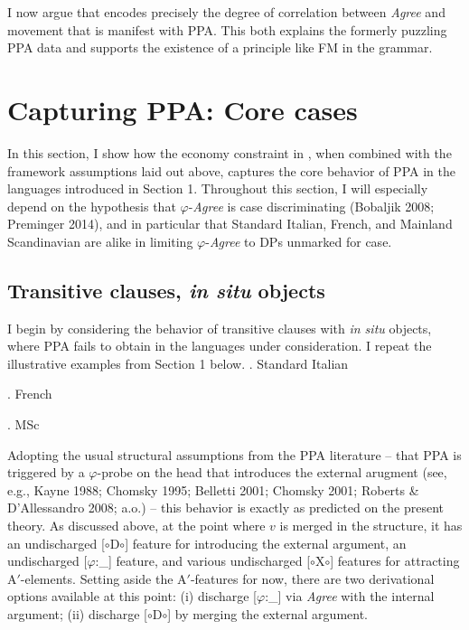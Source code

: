 \documentclass[11pt, letterpaper]{paper_nick}
\newcommand{\fm}[1]{[$\circ$#1$\circ$]}
\begin{document}
I now argue that \Last encodes precisely the degree of correlation between \emph{Agree} and movement that is manifest with PPA. This both explains the formerly puzzling PPA data and supports the existence of a principle like FM in the grammar. 

\section{Capturing PPA: Core cases}
In this section, I show how the economy constraint in \Last, when combined with the framework assumptions laid out above, captures the core behavior of PPA in the languages introduced in Section 1. Throughout this section, I will especially depend on the hypothesis that $\varphi$-\emph{Agree} is case discriminating (Bobaljik 2008; Preminger 2014), and in particular that Standard Italian, French, and Mainland Scandinavian are alike in limiting $\varphi$-\emph{Agree} to DPs unmarked for case.   

\subsection{Transitive clauses, \emph{in situ} objects}
I begin by considering the behavior of transitive clauses with \emph{in situ} objects, where PPA fails to obtain in the languages under consideration. I repeat the illustrative examples from Section 1 below.
\ex. Standard Italian

\ex. French

\ex. MSc

Adopting the usual structural assumptions from the PPA literature -- that PPA is triggered by a $\varphi$-probe on the head that introduces the external arugment (see, e.g., Kayne 1988; Chomsky 1995; Belletti 2001; Chomsky 2001; Roberts \& D'Allessandro 2008; a.o.) -- this behavior is exactly as predicted on the present theory. As discussed above, at the point where $v$ is merged in the structure, it has an undischarged \fm{D} feature for introducing the external argument, an undischarged [$\varphi$:\_] feature, and various undischarged \fm{X} features for attracting A$'$-elements. Setting aside the A$'$-features for now, there are two derivational options available at this point: (i) discharge [$\varphi$:\_] via \emph{Agree} with the internal argument; (ii) discharge \fm{D} by merging the external argument. 
\end{document}
